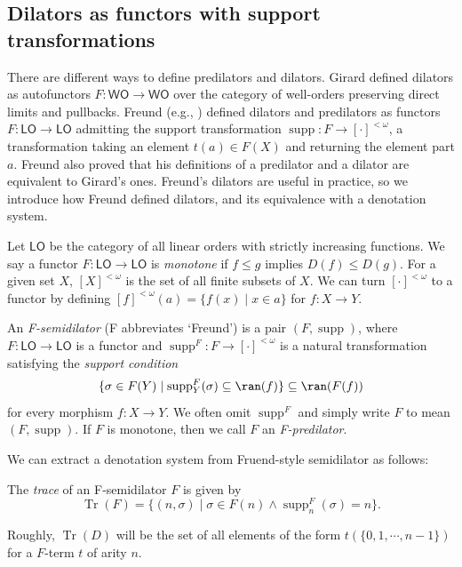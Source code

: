 \documentclass{mhkr}
\newcommand{\added}[1]{#1}
\newcommand{\supp}{\operatorname{supp}}
\newcommand{\Tr}{\operatorname{Tr}}
\newcommand{\WO}{\mathsf{WO}}
\newcommand{\LO}{\mathsf{LO}}
\begin{document}
\subsection{Dilators as functors with support transformations}
There are different ways to define predilators and dilators.
Girard \cite{Girard1981Dilators} defined dilators as autofunctors $F\colon \WO\to \WO$ over the category \added{of} well-orders preserving direct limits and pullbacks. 
Freund \added{(e.g., \cite{FreundPhD, Freund2021Pi14})} defined dilators and predilators as functors $F\colon \LO\to\LO$ admitting the support transformation $\supp \colon F\to [\cdot]^{<\omega}$, a transformation taking an element $t(a)\in F(X)$ and returning the element part $a$. Freund also proved \cite[Remark 2.2.2]{FreundPhD} that his definitions of a predilator and a dilator are equivalent to Girard's ones.
\added{Freund's dilators are useful in practice, so we introduce how Freund defined dilators, and its equivalence with a denotation system.}

Let $\LO$ be the category of all linear orders with strictly increasing functions. We say a functor $F\colon \LO\to\LO$ is \emph{monotone} if $f\le g$ implies $D(f)\le D(g)$.
For a given set $X$, $[X]^{<\omega}$ is the set of all finite subsets of $X$. We can turn $[\cdot]^{<\omega}$ to a functor by defining $[f]^{<\omega}(a)=\{f(x)\mid x\in a\}$ for $f\colon X\to Y$.

\begin{definition}
    An \emph{F-semidilator} (F abbreviates `Freund') is a pair $(F,\supp)$, where $F\colon \LO\to\LO$ is a functor and $\supp^F\colon F\to [\cdot]^{<\omega}$ is a natural transformation satisfying the \emph{support condition}
    \begin{equation} \label{Formula: Support condition}
        \{\sigma\in F(Y) \mid \supp^F_Y(\sigma)\subseteq \ran(f)\} \subseteq \ran(F(f))
    \end{equation}
    for every morphism $f\colon X\to Y$. We often omit $\supp^F$ and simply write $F$ to mean $(F,\supp)$.
    If $F$ is monotone, then we call $F$ an \emph{F-predilator}.
\end{definition}

We can extract a denotation system from Fruend-style semidilator as follows:
\begin{definition}
    The \emph{trace} of an F-semidilator $F$ is given by
    \begin{equation*}
        \Tr(F) = \{(n,\sigma) \mid \sigma\in F(n)\land \supp^F_n(\sigma)=n\}.
    \end{equation*}
\end{definition}
Roughly, $\Tr(D)$ will be the set of all elements of the form $t(\{0,1,\cdots, n-1\})$ for a $F$-term $t$ of arity $n$. 
\end{document}
